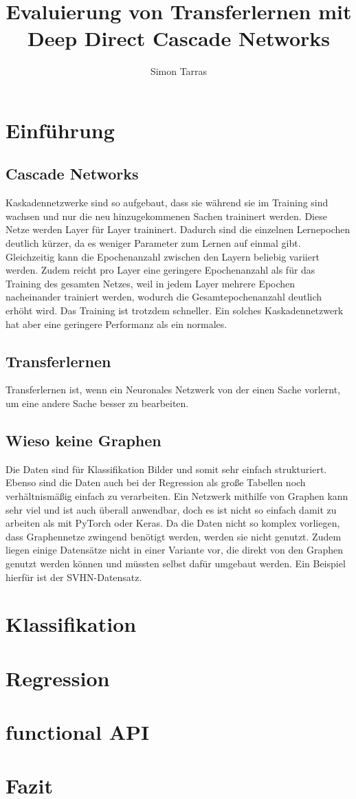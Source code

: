\documentclass[ngerman]{report}
\title{Evaluierung von Transferlernen mit Deep Direct Cascade Networks}
\author{Simon Tarras}
\begin{document}
    \maketitle
    \tableofcontents
    \chapter{Einführung}
        \section{Cascade Networks}
        Kaskadennetzwerke sind so aufgebaut, dass sie während sie 
        im Training sind wachsen und nur die neu hinzugekommenen 
        Sachen traininert werden. \cite{cascor}
        Diese Netze werden Layer für Layer traininert. Dadurch sind die 
        einzelnen Lernepochen deutlich kürzer, da es weniger Parameter 
        zum Lernen auf einmal gibt. Gleichzeitig kann die Epochenanzahl 
        zwischen den Layern beliebig variiert werden. Zudem reicht pro 
        Layer eine geringere Epochenanzahl als für das Training des 
        gesamten Netzes, weil in jedem Layer mehrere Epochen nacheinander 
        trainiert werden, wodurch die Gesamtepochenanzahl deutlich erhöht wird. 
        Das Training ist trotzdem schneller. Ein solches Kaskadennetzwerk 
        hat aber eine geringere Performanz als ein normales. 
        \section{Transferlernen}
        Transferlernen ist, wenn ein Neuronales Netzwerk von der 
        einen Sache vorlernt, um eine andere Sache besser zu 
        bearbeiten.
        \section{Wieso keine Graphen}
        Die Daten sind für Klassifikation Bilder und somit sehr einfach strukturiert. 
        Ebenso sind die Daten auch bei der Regression als große Tabellen noch 
        verhältnismäßig einfach zu verarbeiten. 
        Ein Netzwerk mithilfe von Graphen kann sehr viel und ist auch überall anwendbar, 
        doch es ist nicht so einfach damit zu arbeiten als mit PyTorch oder Keras.
        Da die Daten nicht so komplex vorliegen, dass Graphennetze zwingend benötigt 
        werden, werden sie nicht genutzt. Zudem liegen einige Datensätze nicht in einer 
        Variante vor, die direkt von den Graphen genutzt werden können und müssten 
        selbst dafür umgebaut werden. Ein Beispiel hierfür ist 
        der SVHN-Datensatz.
    \chapter{Klassifikation}
    
    
    \chapter{Regression}
    

    \chapter{functional API}
    

    \chapter{Fazit}
    \printbibliography
\end{document}
